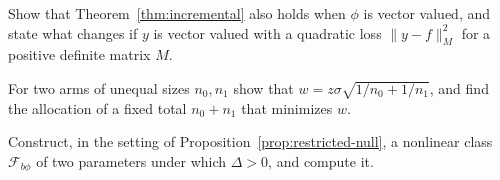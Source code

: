 \begin{exercise}
Show that Theorem~\ref{thm:incremental} also holds when $\phi$ is vector valued, and state what changes if $y$ is vector valued with a quadratic loss $\|y-f\|_M^2$ for a positive definite matrix $M$.
\end{exercise}

\begin{exercise}
For two arms of unequal sizes $n_0,n_1$ show that $w=z\sigma\sqrt{1/n_0+1/n_1}$, and find the allocation of a fixed total $n_0+n_1$ that minimizes $w$.
\end{exercise}

\begin{exercise}
Construct, in the setting of Proposition~\ref{prop:restricted-null}, a nonlinear class $\mathcal F_{b\phi}$ of two parameters under which $\Delta>0$, and compute it.
\end{exercise}
